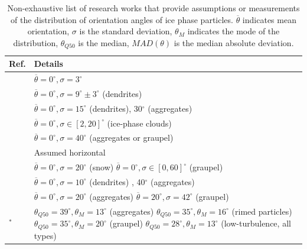 \documentclass[draft]{agujournal2019}
\begin{document}
 \begin{table}
 \caption{Non-exhaustive list of research works that provide assumptions or measurements of the distribution of orientation angles of ice phase particles. $\overline{\theta}$ indicates mean orientation, $\sigma$ is the standard deviation,  $\theta_{M}$ indicates the mode of the distribution, $\theta_{Q50}$ is the median, $MAD(\theta)$ is the median absolute deviation.}
 \label{table:orientations}
 \centering
 \begin{tabular}{l p{90mm}} 
 \hline
  Ref.   & Details \\
 \hline
   \cite{Matrosov_JAM_2001} & $\overline{\theta} = 0^\circ, \sigma = 3^\circ$ \\
   \hline
   \cite{Matrosov_JAS_2005} & $\overline{\theta} = 0^\circ, \sigma = 9^\circ \pm3^\circ$ (dendrites) \\
   \hline
    \cite{Kennedy_JAMC_2011}  &   $\overline{\theta} = 0^\circ, \sigma = 15^\circ$ (dendrites), 30$^\circ$ (aggregates) \\
   \hline
    \cite{Melnikov_JAOT_2013} & $\overline{\theta} = 0^\circ, \sigma  \in [2,20]^\circ$ (ice-phase clouds) \\
   \hline
    \cite{Ryzhkov_JAMC_2011} & $\overline{\theta} = 0^\circ, \sigma = 40^\circ$ (aggregates or graupel) \\
   \hline
   \cite{Hogan_JAMC_2012} & Assumed horizontal  \\
   \hline   
   \cite{Putnam_MWR_2017} & $\overline{\theta} = 0^\circ , \sigma = 20^\circ$ (snow) \newline 
   $\overline{\theta} = 0^\circ , \sigma \in [0,60]^\circ$ (graupel) \\
   \hline
   \cite{Bukovic_JAMC_2018} &  $\overline{\theta} = 0^\circ, \sigma = 10^\circ$ (dendrites) , 40$^\circ$ (aggregates) \\
   \hline
    \cite{Matsui_JGRA_2019}  & $\overline{\theta} = 0^\circ , \sigma = 20^\circ$ (aggregates) \newline 
   $\overline{\theta} = 20^\circ , \sigma = 42^\circ$ (graupel) \\
   \hline
   \cite{Garrett_GRL_2015}$^*$ & $\theta_{Q50} = 39^\circ, \theta_{M} = 13^\circ$ (aggregates) \newline
   $\theta_{Q50} = 35^\circ, \theta_{M} = 16^\circ$ (rimed particles) \newline
   $\theta_{Q50} = 35^\circ, \theta_{M} = 20^\circ$ (graupel) \newline
   $\theta_{Q50} = 28^\circ, \theta_{M} = 13^\circ$ (low-turbulence, all types) \newline

\end{tabular}
\end{table}
\end{document}
